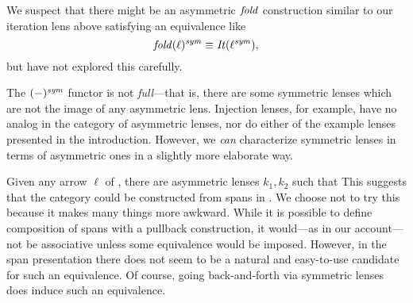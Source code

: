 \begin{defn}[$R$-similarity]
\begin{theorem}
\begin{lemma}
\begin{theorem}[No products]
\begin{lemma}
\begin{defn}
\begin{theorem}
\begin{corollary}[Hylomorphism]
\begin{defn}
\begin{defn}[Symmetrization]
We suspect that there might be an asymmetric $\mathit{fold}$ construction
similar to our iteration lens above satisfying an equivalence like
\[\mathit{fold}(\ell)^\mathit{sym} \equiv \mathit{It}(\ell^\mathit{sym}),\]
but have not explored this carefully.

The $(-)^\mathit{sym}$ functor is not {\em full}---that is,
there are some symmetric lenses which are not the image of any asymmetric
lens. Injection lenses, for example, have no analog in the category of
asymmetric lenses, nor do either of the example lenses presented in the
introduction. However, we \emph{can} characterize symmetric lenses in
terms of asymmetric ones in a slightly more elaborate way.

\iffull
\begin{theorem}\label{asymmetrization_of_lenses}
\else
\begin{theorem}\label{asymmetrization_of_lenses}
\fi
  Given any arrow $\ell$ of \LENS{}, there are asymmetric lenses
  $k_1,k_2$ such that  \iffull This suggests that the category \LENS{} could be
  constructed from spans in \ALENS. We choose not to try this because
  it makes many things more awkward. While it is possible to define
  composition of spans with a pullback construction, it would---as in
  our account---not be associative unless some equivalence would be
  imposed. However, in the span presentation there does not seem to be
  a natural and easy-to-use candidate for such an equivalence. Of
  course, going back-and-forth via symmetric lenses does induce such
  an equivalence.
  \fi
\end{theorem}


\end{theorem}
\end{defn}
\end{defn}
\end{corollary}
\end{theorem}
\end{defn}
\end{lemma}
\end{theorem}
\end{lemma}
\end{theorem}
\end{defn}
